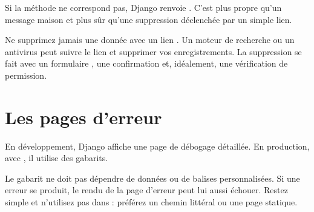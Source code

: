 Si la méthode ne correspond pas, Django renvoie .
C'est plus propre qu'un message maison et plus sûr qu'une suppression déclenchée
par un simple lien.

\begin{attention}
Ne supprimez jamais une donnée avec un lien . Un moteur de
recherche ou un antivirus peut suivre le lien et supprimer vos enregistrements. La
suppression se fait avec un formulaire , une confirmation et, idéalement,
une vérification de permission.
\end{attention}

\section{Les pages d'erreur}

En développement, Django affiche une page de débogage détaillée. En production,
avec , il utilise des gabarits.



\begin{attention}
Le gabarit  ne doit pas dépendre de données ou de balises
personnalisées. Si une erreur se produit, le rendu de la page d'erreur peut lui
aussi échouer. Restez simple et n'utilisez pas  dans  :
préférez un chemin littéral ou une page statique.
\end{attention}

